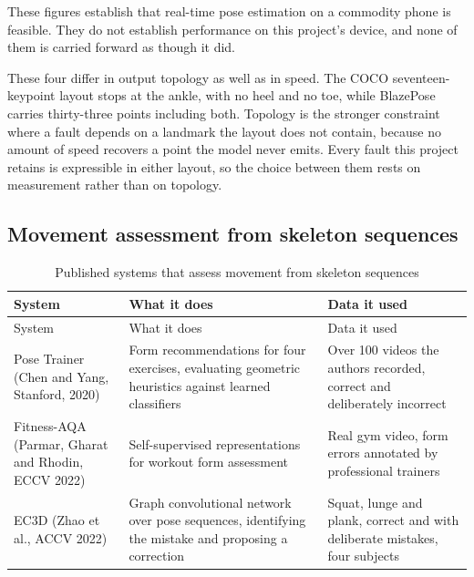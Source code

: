 These figures establish that real-time pose estimation on a commodity phone is feasible. They do not establish performance on this project's device, and none of them is carried forward as though it did.

These four differ in output topology as well as in speed. The COCO seventeen-keypoint layout stops at the ankle, with no heel and no toe, while BlazePose carries thirty-three points including both. Topology is the stronger constraint where a fault depends on a landmark the layout does not contain, because no amount of speed recovers a point the model never emits. Every fault this project retains is expressible in either layout, so the choice between them rests on measurement rather than on topology.

\subsection{Movement assessment from skeleton sequences}
\label{sec:2.3.2}

{\small
\setlength{\LTpre}{6pt}\setlength{\LTpost}{8pt}
\begin{longtable}{>{\raggedright\arraybackslash}p{}>{\raggedright\arraybackslash}p{}>{\raggedright\arraybackslash}p{}}
\caption{Published systems that assess movement from skeleton sequences}\\
\toprule
System & What it does & Data it used \\
\midrule
\endfirsthead
\toprule
System & What it does & Data it used \\
\midrule
\endhead
\bottomrule
\endfoot
\bottomrule
\endlastfoot
Pose Trainer (Chen and Yang, Stanford, 2020)\cite{chen2020posetrainer} & Form recommendations for four exercises, evaluating geometric heuristics against learned classifiers & Over 100 videos the authors recorded, correct and deliberately incorrect \\
Fitness-AQA (Parmar, Gharat and Rhodin, ECCV 2022)\cite{parmar2022fitnessaqa} & Self-supervised representations for workout form assessment & Real gym video, form errors annotated by professional trainers \\
EC3D (Zhao et al., ACCV 2022)\cite{zhao2022ec3d} & Graph convolutional network over pose sequences, identifying the mistake and proposing a correction & Squat, lunge and plank, correct and with deliberate mistakes, four subjects \\
\end{longtable}
}

